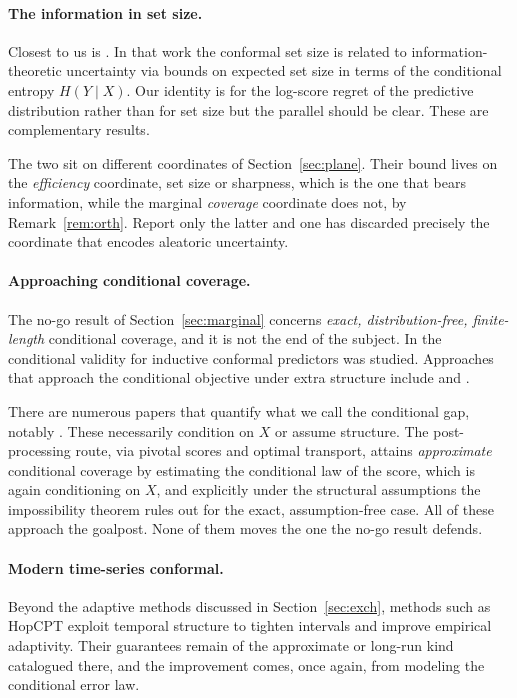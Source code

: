 \documentclass[11pt]{article}
\theoremstyle{definition}
\begin{document}
\paragraph{The information in set size.}
Closest to us is \citet{correia2024information}. In that work the conformal set size is related to
information-theoretic uncertainty via bounds on expected set size in terms of the conditional
entropy $H(Y\mid X)$. Our identity is for the log-score regret of the predictive
distribution rather than for set size but the parallel should be clear. These are complementary
results.

The two sit on different coordinates of Section~\ref{sec:plane}. Their bound lives on the
\emph{efficiency} coordinate, set size or sharpness, which is the one that bears
information, while the marginal \emph{coverage} coordinate does not, by
Remark~\ref{rem:orth}. Report only the latter and one has discarded precisely the coordinate
that encodes aleatoric uncertainty.

\paragraph{Approaching conditional coverage.}
The no-go result of Section~\ref{sec:marginal} concerns \emph{exact, distribution-free,
finite-length} conditional coverage, and it is not the end of the subject. In
\citet{vovk2012conditional} the conditional validity for inductive conformal predictors was
studied. Approaches that approach the conditional objective under extra structure include
\citet{gibbs2025conditional} and \citet{laplante2026pivotal}.

There are numerous papers that quantify what we call the conditional gap, notably
\citet{braun2025conditional}. These necessarily condition on $X$ or assume structure.
The post-processing route, via pivotal scores and optimal transport, attains
\emph{approximate} conditional coverage by estimating the conditional law of the score,
which is again conditioning on $X$, and explicitly under the structural assumptions the
impossibility theorem rules out for the exact, assumption-free case. All of these approach
the goalpost. None of them moves the one the no-go result defends.

\paragraph{Modern time-series conformal.}
Beyond the adaptive methods discussed in Section~\ref{sec:exch}, methods such as HopCPT
\citep{auer2023hopcpt} exploit temporal structure to tighten intervals and improve empirical
adaptivity. Their guarantees remain of the approximate or long-run kind catalogued there,
and the improvement comes, once again, from modeling the conditional error law.
\end{document}
